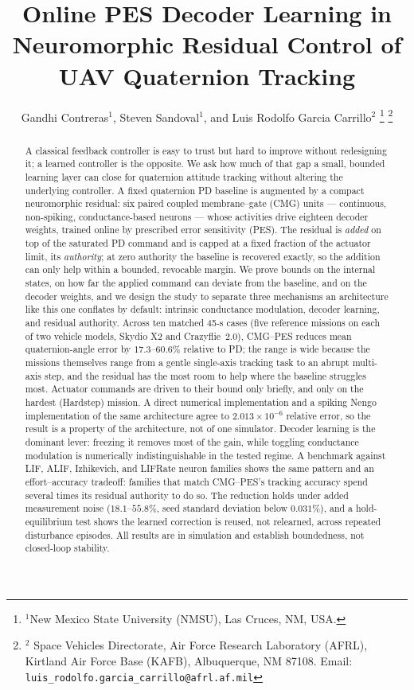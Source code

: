 \documentclass[letterpaper, 10 pt, conference]{ieeeconf}
\title{\LARGE \bf Online PES Decoder Learning in Neuromorphic Residual Control of UAV Quaternion Tracking}
\author{Gandhi Contreras$^{1}$, Steven Sandoval$^{1}$, and Luis Rodolfo Garcia Carrillo$^{2}$%
\thanks{$^{1}$New Mexico State University (NMSU), Las Cruces, NM, USA.}%
\thanks{$^{2}$ Space Vehicles Directorate, Air Force Research Laboratory (AFRL), Kirtland Air Force Base (KAFB), Albuquerque, NM 87108.
    Email: {\tt\small luis\_rodolfo.garcia\_carrillo@afrl.af.mil}}%
}
\begin{document}
\maketitle

\pagestyle{plain}
\thispagestyle{plain}

\begin{abstract}
A classical feedback controller is easy to trust but hard to improve without
redesigning it; a learned controller is the opposite. We ask how much of that
gap a small, bounded learning layer can close for quaternion attitude
tracking without altering the underlying controller. A fixed quaternion PD
baseline is augmented by a compact neuromorphic residual: six paired coupled
membrane--gate (CMG) units --- continuous, non-spiking, conductance-based
neurons --- whose activities drive eighteen decoder weights, trained online
by prescribed error sensitivity (PES). The residual is \emph{added} on top of
the saturated PD command and is capped at a fixed fraction of the actuator
limit, its \emph{authority}; at zero authority the baseline is recovered
exactly, so the addition can only help within a bounded, revocable margin. We
prove bounds on the internal states, on how far the applied command can
deviate from the baseline, and on the decoder weights, and we design the
study to separate three mechanisms an architecture like this one conflates by
default: intrinsic conductance modulation, decoder learning, and residual
authority.
Across ten matched 45-s cases (five reference missions on each of two vehicle
models, Skydio X2 and Crazyflie~2.0), CMG--PES reduces mean quaternion-angle
error by $17.3$--$60.6\%$ relative to PD; the range is wide because the
missions themselves range from a gentle single-axis tracking task to an
abrupt multi-axis step, and the residual has the most room to help where the
baseline struggles most. Actuator commands are driven to their bound only
briefly, and only on the hardest (Hardstep) mission. A direct numerical
implementation and a spiking Nengo implementation of the same architecture
agree to $2.013\times10^{-6}$ relative error, so the result is a property of
the architecture, not of one simulator. Decoder learning is the dominant
lever: freezing it removes most of the gain, while toggling conductance
modulation is numerically indistinguishable in the tested regime. A benchmark
against LIF, ALIF, Izhikevich, and LIFRate neuron families shows the same
pattern and an effort--accuracy tradeoff: families that match CMG--PES's
tracking accuracy spend several times its residual authority to do so. The
reduction holds under added measurement noise ($18.1$--$55.8\%$, seed
standard deviation below $0.031\%$), and a hold-equilibrium test shows the
learned correction is reused, not relearned, across repeated disturbance
episodes. All results are in simulation and establish boundedness, not
closed-loop stability.
\end{abstract}
\end{document}
